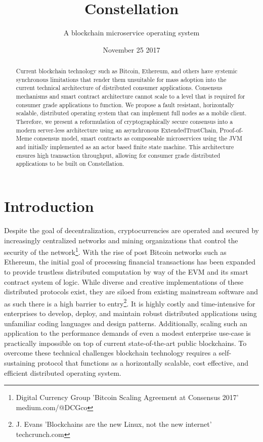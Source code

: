 \documentclass{article}
\title{Constellation}
\author{A blockchain microservice operating system}
\date{November 25 2017}
\begin{document}
\maketitle

\begin{abstract}
Current blockchain technology such as Bitcoin, Ethereum, and others have systemic synchronous limitations that render them unsuitable for mass adoption into the current technical architecture of distributed consumer applications. Consensus mechanisms and smart contract architecture cannot scale to a level that is required for consumer grade applications to function. We propose a fault resistant, horizontally scalable, distributed operating system that can implement full nodes as a mobile client. Therefore, we present a reformulation of cryptographically secure consensus into a modern server-less architecture using an asynchronous ExtendedTrustChain, Proof-of-Meme consensus model,  smart contracts as composeable microservices using the JVM and initially implemented as an actor based finite state machine. This architecture ensures high transaction throughput, allowing for consumer grade distributed applications to be built on Constellation. \

\end{abstract}
\setcounter{secnumdepth}{0}
\section{Introduction}
Despite the goal of decentralization, cryptocurrencies are operated and secured by increasingly centralized networks and mining organizations that control the security of the network\footnote{Digital Currency Group 'Bitcoin Scaling Agreement at Consensus 2017' medium.com/@DCGco}. With the rise of post Bitcoin networks such as Ethereum, the initial goal of processing financial transactions has been expanded to provide trustless distributed computation by way of the EVM and its smart contract system of logic. While diverse and creative implementations of these distributed protocols exist, they are siloed from existing mainstream software and as such there is a high barrier to entry\footnote{J. Evans 'Blockchains are the new Linux, not the new internet' techcrunch.com}. It is highly costly and time-intensive for enterprises to develop, deploy, and maintain robust distributed applications using unfamiliar coding languages and design patterns. Additionally, scaling such an application to the performance demands of even a modest enterprise use-case is practically impossible on top of current state-of-the-art public blockchains. To overcome these technical challenges blockchain technology requires a self-sustaining protocol that functions as a horizontally scalable, cost effective, and efficient distributed operating system.
\end{document}
